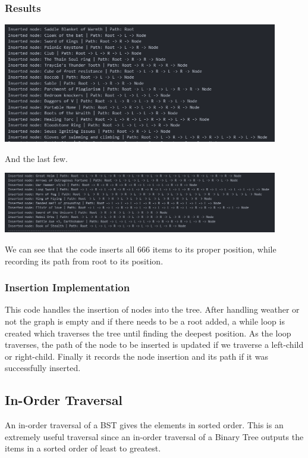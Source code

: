 \documentclass[12pt, letterpaper]{article}
\begin{document}
\subsubsection{Results}
\begin{center}
   \includegraphics[width=120mm, scale=0.5]{Images/BinTree_InsertStart.png}
\end{center}
And the last few.
\begin{center}
   \includegraphics[width=120mm, scale=0.5]{Images/BinTree_InsertEnd.png}
\end{center}
We can see that the code inserts all 666 items to its proper position, while recording its path from root to its position.
\subsubsection{Insertion Implementation}
\begin{center}
   
\end{center}
This code handles the insertion of nodes into the tree.
After handling weather or not the graph is empty and if there needs to be a root added, a while loop is created which traverses the tree until finding the deepest position.
As the loop traverses, the path of the node to be inserted is updated if we traverse a left-child or right-child.
Finally it records the node insertion and its path if it was successfully inserted.

\subsection{In-Order Traversal} \label{Trav}
An in-order traversal of a BST gives the elements in sorted order.
This is an extremely useful traversal since an in-order traversal of a Binary Tree outputs the items in a sorted order of least to greatest.
\end{document}
